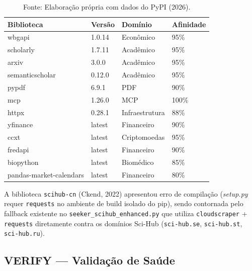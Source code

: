 \documentclass[12pt,a4paper]{article}
\begin{document}
\begin{table}[H]
  \centering
  \caption{Bibliotecas instaladas pelo pipeline /evolve (Rounds 8–9)}
  \label{tab:installed}
  \begin{tabular}{llll}
    \toprule
    \textbf{Biblioteca} & \textbf{Versão} & \textbf{Domínio} & \textbf{Afinidade} \\
    \midrule
    wbgapi          & 1.0.14   & Econômico       & 95\% \\
    scholarly       & 1.7.11   & Acadêmico       & 95\% \\
    arxiv           & 3.0.0    & Acadêmico       & 95\% \\
    semanticscholar & 0.12.0   & Acadêmico       & 95\% \\
    pypdf           & 6.9.1    & PDF             & 90\% \\
    mcp             & 1.26.0   & MCP             & 100\% \\
    httpx           & 0.28.1   & Infraestrutura  & 88\% \\
    yfinance        & latest   & Financeiro      & 90\% \\
    ccxt            & latest   & Criptomoedas    & 95\% \\
    fredapi         & latest   & Financeiro      & 90\% \\
    biopython       & latest   & Biomédico       & 85\% \\
    pandas-market-calendars & latest & Financeiro & 80\% \\
    \bottomrule
  \end{tabular}
  \caption*{Fonte: Elaboração própria com dados do PyPI (2026).}
\end{table}

A biblioteca \texttt{scihub-cn} (Ckend, 2022) apresentou erro de compilação (\textit{setup.py} requer \texttt{requests} no ambiente de build isolado do pip), sendo contornada pelo fallback existente no \texttt{seeker\_scihub\_enhanced.py} que utiliza \texttt{cloudscraper} + \texttt{requests} diretamente contra os domínios Sci-Hub (\texttt{sci-hub.se}, \texttt{sci-hub.st}, \texttt{sci-hub.ru}).

\subsection{VERIFY — Validação de Saúde}
\end{document}
